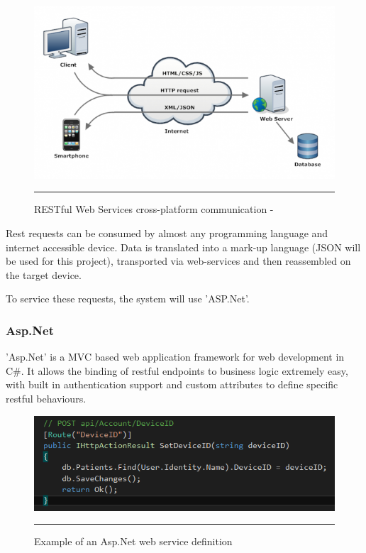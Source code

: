 \begin{figure}[htbp]
	\centering
\includegraphics[width=\textwidth,height=\textheight,keepaspectratio]{Figures/rest.png}
		\rule{35em}{0.5pt}
	\caption[RESTful Web Services cross-platform communication - \cite{rest}]{RESTful Web Services cross-platform communication - \cite{rest}}
	\label{fig:rest}
\end{figure}

Rest requests can be consumed by almost any programming language and internet accessible device. Data is translated into a mark-up language (JSON will be used for this project), transported via web-services and then reassembled on the target device.

To service these requests, the system will use 'ASP.Net'.

\subsubsection{Asp.Net}

'Asp.Net' is a MVC based web application framework for web development in C\#. It allows the binding of restful endpoints to business logic extremely easy, with built in authentication support and custom attributes to define specific restful behaviours.

\begin{figure}[htbp]
	\centering
\includegraphics[width=\textwidth,height=\textheight,keepaspectratio]{Figures/asp_example.png}
		\rule{35em}{0.5pt}
	\caption[Example of an Asp.Net web service definition]{Example of an Asp.Net web service definition}
	\label{fig:asp}
\end{figure}

